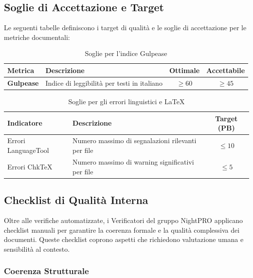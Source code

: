 \documentclass[a4paper,11pt,oneside]{scrartcl}
\begin{document}
\subsection{Soglie di Accettazione e Target}

Le seguenti tabelle definiscono i target di qualità e le soglie di accettazione per le metriche documentali:

\begin{table}[h!]
    \centering
    \renewcommand{\arraystretch}{1.3}
    \begin{tabularx}{\textwidth}{lXcc}
        \toprule
        \textbf{Metrica}  & \textbf{Descrizione}                        & \textbf{Ottimale} & \textbf{Accettabile} \\
        \midrule
        \textbf{Gulpease} & Indice di leggibilità per testi in italiano & $\ge 60$          & $\ge 45$             \\
        \bottomrule
    \end{tabularx}
    \caption{Soglie per l'indice Gulpease}
\end{table}

\begin{table}[h!]
    \centering
    \renewcommand{\arraystretch}{1.3}
    \begin{tabularx}{\textwidth}{lXc}
        \toprule
        \textbf{Indicatore} & \textbf{Descrizione}                              & \textbf{Target (PB)} \\
        \midrule
        Errori LanguageTool & Numero massimo di segnalazioni rilevanti per file & $\le 10$             \\
        Errori ChkTeX       & Numero massimo di warning significativi per file  & $\le 5$              \\
        \bottomrule
    \end{tabularx}
    \caption{Soglie per gli errori linguistici e \LaTeX}
\end{table}


\subsection{Checklist di Qualità Interna}

Oltre alle verifiche automatizzate, i Verificatori del gruppo NightPRO applicano checklist manuali per garantire la coerenza formale e la qualità complessiva dei documenti. Queste checklist coprono aspetti che richiedono valutazione umana e sensibilità al contesto.

\subsubsection{Coerenza Strutturale}
\end{document}
